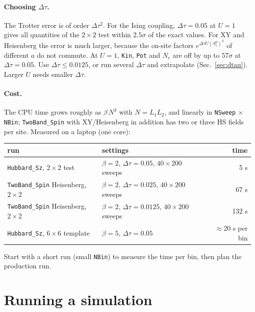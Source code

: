 \documentclass[11pt,a4paper]{article}
\newcommand{\f}[1]{\texttt{#1}}          %
\begin{document}
\paragraph{Choosing $\Delta\tau$.}
The Trotter error is of order $\Delta\tau^2$. For the Ising coupling, $\Delta\tau=0.05$ at
$U=1$ gives all quantities of the $2\times2$ test within $2.5\sigma$ of the exact values. For XY and Heisenberg the
error is much larger, because the on-site factors $e^{\Delta\tau U(S^a_i)^2}$ of different
$a$ do not commute. At $U=1$, \f{Kin}, \f{Pot} and $N_c$ are off by up to $57\sigma$ at
$\Delta\tau=0.05$. Use $\Delta\tau\le0.0125$, or run several $\Delta\tau$ and extrapolate
(Sec.~\ref{sec:dtau}). Larger $U$ needs smaller $\Delta\tau$.

\paragraph{Cost.}
The CPU time grows roughly as $\beta\,N^3$ with $N=L_1L_2$, and linearly in \f{NSweep}
$\times$ \f{NBin}; \f{TwoBand\_Spin} with XY/Heisenberg in addition has two or three HS fields
per site. Measured on a laptop (one core):
\begin{center}
\small
\begin{tabular}{llr}
\toprule
run & settings & time \\
\midrule
\f{Hubbard\_Sz}, $2\times2$ test & $\beta=2$, $\Delta\tau=0.05$, $40\times200$ sweeps & 5 s \\
\f{TwoBand\_Spin} Heisenberg, $2\times2$ & $\beta=2$, $\Delta\tau=0.025$, $40\times200$ sweeps & 67 s \\
\f{TwoBand\_Spin} Heisenberg, $2\times2$ & $\beta=2$, $\Delta\tau=0.0125$, $40\times200$ sweeps & 132 s \\
\f{Hubbard\_Sz}, $6\times6$ template & $\beta=5$, $\Delta\tau=0.05$ & $\approx$20 s per bin \\
\bottomrule
\end{tabular}
\end{center}
Start with a short run (small \f{NBin}) to measure the time per bin, then plan the
production run.

\section{Running a simulation}
\end{document}
